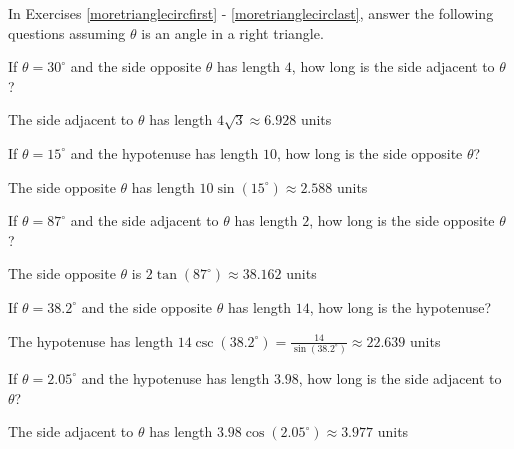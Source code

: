\documentclass{ximera}
\begin{document}
\begin{question}
In Exercises \ref{moretrianglecircfirst} - \ref{moretrianglecirclast}, answer the following questions assuming  $\theta$ is an angle in a right triangle.

\begin{problem}  \label{moretrianglecircfirst}
If $\theta = 30^{\circ}$ and the side opposite $\theta$ has length $4$, how long is the side adjacent to $\theta$? 

\begin{solution}
The side adjacent to $\theta$ has length $4\sqrt{3} \approx 6.928$ units
\end{solution}
\end{problem}

\begin{problem}
If $\theta = 15^{\circ}$ and the hypotenuse has length $10$, how long is the side opposite $\theta$?

\begin{solution}
The side opposite $\theta$ has length $10 \sin(15^{\circ}) \approx 2.588$ units
\end{solution}

\end{problem}

\begin{problem}
If $\theta = 87^{\circ}$ and the side adjacent to $\theta$ has length $2$, how long is the side opposite $\theta$?

\begin{solution}
The side opposite $\theta$ is $2\tan(87^{\circ}) \approx 38.162$ units
\end{solution}
\end{problem}

\begin{problem}
If $\theta = 38.2^{\circ}$ and the side opposite $\theta$ has length $14$, how long is the hypotenuse?

\begin{solution}
The hypotenuse has length $14 \csc(38.2^{\circ}) = \frac{14}{\sin(38.2^{\circ})} \approx 22.639$ units
\end{solution}
\end{problem}

\begin{problem}
If $\theta = 2.05^{\circ}$ and the hypotenuse has length $3.98$, how long is the side adjacent to $\theta$?

\begin{solution}
The side adjacent to $\theta$ has length $3.98 \cos(2.05^{\circ}) \approx 3.977$ units
\end{solution}
\end{problem}


\end{question}
\end{document}
